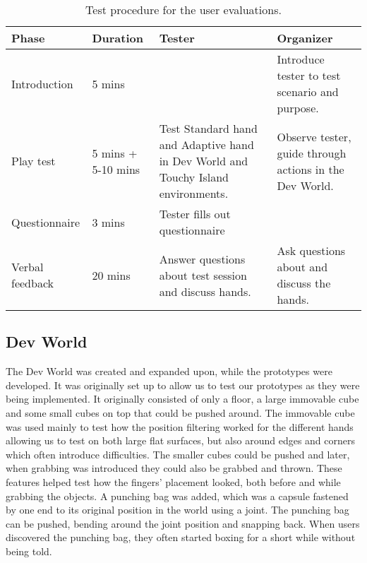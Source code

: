 \begin{table}[h]
\centering
\caption{Test procedure for the user evaluations.}
\label{tab:testProcedure}
\begin{tabular}{lL{2cm}L{5cm}L{5cm}}
Phase & Duration & Tester & Organizer \\ \midrule \midrule
Introduction & 5 mins & & Introduce tester to test scenario and purpose. \\ \midrule
Play test & 5 mins + 5-10 mins & Test Standard hand and Adaptive hand in Dev World and Touchy Island environments. & Observe tester, guide through actions in the Dev World. \\ \midrule
Questionnaire & 3 mins &Tester fills out questionnaire & \\ \midrule
Verbal feedback & 20 mins & Answer questions about test session and discuss hands. & Ask questions about and discuss the hands. \\
\end{tabular}
\end{table}

\subsection{Dev World}
\label{subsec:devWorld}
The Dev World was created and expanded upon, while the prototypes were developed. It was originally set up to allow us to test our prototypes as they were being implemented. It originally consisted of only a floor, a large immovable cube and some small cubes on top that could be pushed around. The immovable cube was used mainly to test how the position filtering worked for the different hands allowing us to test on both large flat surfaces, but also around edges and corners which often introduce difficulties. The smaller cubes could be pushed and later, when grabbing was introduced they could also be grabbed and thrown. These features helped test how the fingers' placement looked, both before and while grabbing the objects. A punching bag was added, which was a capsule fastened by one end to its original position in the world using a joint. The punching bag can be pushed, bending around the joint position and snapping back. When users discovered the punching bag, they often started boxing for a short while without being told.

